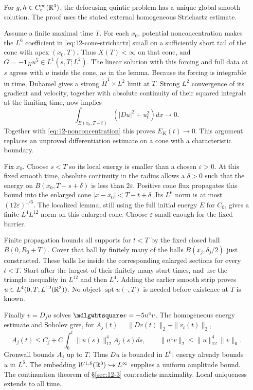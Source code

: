 \begin{theorem}
For $g,h\in C_c^\infty(\mathbb{R}^3)$, the defocusing quintic problem has
a unique global smooth solution. The proof uses the stated external
homogeneous Strichartz estimate.
\end{theorem}
\begin{expandedproof}
Assume a finite maximal time $T$. For each $x_0$, potential
nonconcentration makes the $L^6$ coefficient in
\eqref{eq:12-cone-strichartz} small on a sufficiently short tail of
the cone with apex $(x_0,T)$. Thus $X(T)<\infty$ on that cone, and
$G=-\mathbf1_Ku^5\in L^1(s,T;L^2)$.
The linear solution with this forcing and full data at $s$ agrees
with $u$ inside the cone, as in the lemma. Because its forcing is
integrable in time, Duhamel gives a strong
$\dot H^1\times L^2$ limit at $T$.
Strong $L^2$ convergence of its gradient and velocity, together with
absolute continuity of their squared integrals at the limiting time,
now implies
\[
 \int_{B(x_0,T-t)}(|Du|^2+u_t^2)dx\longrightarrow0.
\]
Together with \eqref{eq:12-nonconcentration} this proves
$E_K(t)\to0$. This argument replaces an unproved differentiation
estimate on a cone with a characteristic boundary.

Fix $x_0$. Choose $s<T$ so its local energy is smaller than a chosen
$\varepsilon>0$. At this fixed smooth time, absolute continuity in
the radius allows a $\delta>0$ such that the energy on
$B(x_0,T-s+\delta)$ is less than $2\varepsilon$.
Positive cone flux propagates this bound into the enlarged cone
$|x-x_0|<T-t+\delta$. Its $L^6$ norm is at most
$(12\varepsilon)^{1/6}$. The localized lemma, still using the full
initial energy $E$ for $C_0$, gives a finite $L^4L^{12}$ norm on this
enlarged cone. Choose $\varepsilon$ small enough for the fixed barrier.

Finite propagation bounds all supports for $t<T$ by the fixed closed
ball $\overline B(0,R_0+T)$. Cover that ball by finitely many of the
balls $B(x_j,\delta_j/2)$ just constructed. These balls lie inside
the corresponding enlarged sections for every $t<T$. Start after
the largest of their finitely many start times, and use the triangle
inequality in $L^{12}$ and then $L^4$. Adding the earlier smooth
strip proves $u\in L^4(0,T;L^{12}(\mathbb{R}^3))$.
No object $\operatorname{spt}u(\cdot,T)$ is needed before existence
at $T$ is known.

Finally $v=D_ju$ solves $\PDEWave v=-5u^4v$. The homogeneous energy
estimate and Sobolev give, for
$A_j(t)=\|Dv(t)\|_2+\|v_t(t)\|_2$,
\[
 A_j(t)\le C_j+C\int_0^t\|u(s)\|_{12}^4 A_j(s)ds,
 \qquad \|u^4v\|_2\le\|u\|_{12}^4\|v\|_6.
\]
Gronwall bounds $A_j$ up to $T$. Thus $Du$ is bounded in $L^6$;
energy already bounds $u$ in $L^6$. The embedding
$W^{1,6}(\mathbb{R}^3)\hookrightarrow L^\infty$ supplies a uniform amplitude
bound. The continuation theorem of \S\ref{sec:12-3} contradicts
maximality. Local uniqueness extends to all time.
\end{expandedproof}
